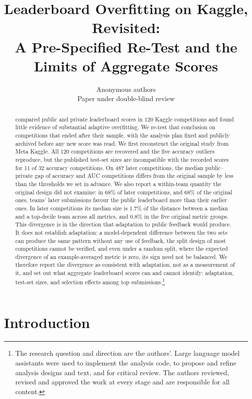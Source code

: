 \documentclass[10pt]{article}
\title{Leaderboard Overfitting on Kaggle, Revisited:\\ A Pre-Specified Re-Test and the Limits of Aggregate Scores}
\author{\name Anonymous authors \\ \addr Paper under double-blind review}
\begin{document}
\maketitle

\begin{abstract}
\citet{roelofs2019meta} compared public and private leaderboard scores in 120 Kaggle competitions and found little evidence of substantial adaptive overfitting. We re-test that conclusion on competitions that ended after their sample, with the analysis plan fixed and publicly archived before any new score was read. We first reconstruct the original study from Meta Kaggle. All 120 competitions are recovered and the five accuracy outliers reproduce, but the published test-set sizes are incompatible with the recorded scores for 11 of 32 accuracy competitions. On 487 later competitions, the median public--private gap of accuracy and AUC competitions differs from the original sample by less than the thresholds we set in advance. We also report a within-team quantity the original design did not examine: in 68\% of later competitions, and 68\% of the original ones, teams' later submissions favour the public leaderboard more than their earlier ones. In later competitions its median size is 1.7\% of the distance between a median and a top-decile team across all metrics, and 0.8\% in the five original metric groups. This divergence is in the direction that adaptation to public feedback would produce. It does not establish adaptation: a model-dependent difference between the two sets can produce the same pattern without any use of feedback, the split design of most competitions cannot be verified, and even under a random split, where the expected divergence of an example-averaged metric is zero, its sign need not be balanced. We therefore report the divergence as consistent with adaptation, not as a measurement of it, and set out what aggregate leaderboard scores can and cannot identify: adaptation, test-set sizes, and selection effects among top submissions.\footnote{The research question and direction are the authors'. Large language model assistants were used to implement the analysis code, to propose and refine analysis designs and text, and for critical review. The authors reviewed, revised and approved the work at every stage and are responsible for all content.}
\end{abstract}

\section{Introduction}
\end{document}
